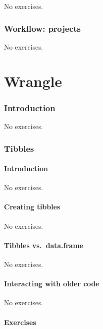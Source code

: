 \documentclass[]{article}
\theoremstyle{definition}
\theoremstyle{definition}
\theoremstyle{definition}
\theoremstyle{remark}
\begin{document}
No exercises.

\section{Workflow: projects}\label{workflow-projects}

No exercises.

\part{Wrangle}\label{part-wrangle}

\section{Introduction}\label{introduction-5}

No exercises.

\section{Tibbles}\label{tibbles}

\subsection{Introduction}\label{introduction-6}

No exercises.

\subsection{Creating tibbles}\label{creating-tibbles}

No exercises.

\subsection{Tibbles vs.~data.frame}\label{tibbles-vs.data.frame}

No exercises.

\subsection{Interacting with older
code}\label{interacting-with-older-code}

No exercises.

\subsection{Exercises}\label{exercises-18}
\end{document}
